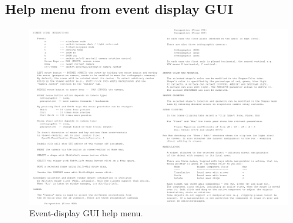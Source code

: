 \documentclass[12pt]{article}
\begin{document}
\pagebreak
\subsection{Help menu from event display GUI}

\begin{figure}[H]
\centering
\includegraphics[width=\textwidth]{figures/viewer_help.jpg}
\caption{Event-display GUI help menu.}
\label{fig:visual_help}
\end{figure}

%
%
\end{document}
